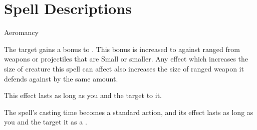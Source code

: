 
\section{Spell Descriptions}

\begin{spellsection}{Aeromancy}

\begin{spellheader}
\end{spellheader}

\begin{spellcontent}

\begin{spelltargetinginfo}



\end{spelltargetinginfo}


\begin{spelleffects}



\spelleffect
The target gains a  bonus to .
This bonus is increased to  against ranged  from weapons or projectiles that are Small or smaller.
Any effect which increases the size of creature this spell can affect also increases the size of ranged weapon it defends against by the same amount.

This effect lasts as long as you and the target  to it.








\end{spelleffects}

\end{spellcontent}
\begin{spellfooter}


\end{spellfooter}
\begin{spellsubcontent}


\begin{spellcantrip}
The spell's casting time becomes a standard action, and its effect lasts as long as you and the target  it as a .
\end{spellcantrip}


\end{spellsubcontent}
\end{spellsection}


